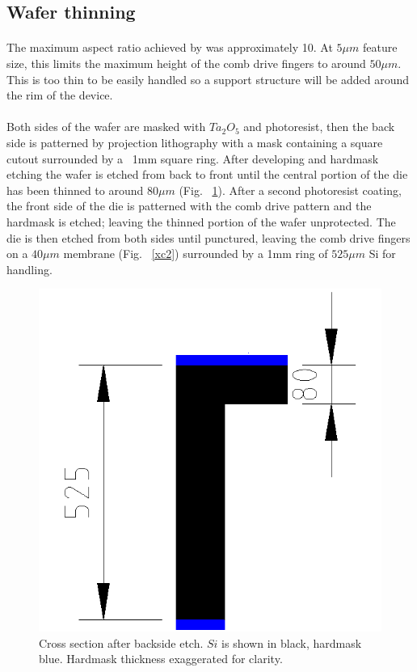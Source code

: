 \documentclass[twocolumn]{article}
\begin{document}
\subsection{Wafer thinning}
\paragraph*{}
The maximum aspect ratio achieved by \cite{SmoothWalls} was approximately 10. At $5 \mu m$ feature
size, this limits the maximum height of the comb drive fingers to around $50 \mu m$. This is too
thin to be easily handled so a support structure will be added around the rim of the device.

\paragraph*{}
Both sides of the wafer are masked with $Ta_2O_5$ and photoresist, then the back side is patterned
by projection lithography with a mask containing a square cutout surrounded by a ~1mm square ring.
After developing and hardmask etching the wafer is etched from back to front until the central
portion of the die has been thinned to around $80 \mu m$ (Fig. ~\ref{xc1}). After a second
photoresist coating, the front side of the die is patterned with the comb drive pattern and the
hardmask is etched; leaving the thinned portion of the wafer unprotected. The die is then etched
from both sides until punctured, leaving the comb drive fingers on a $40 \mu m$ membrane
(Fig. ~\ref{xc2}) surrounded by a 1mm ring of $525 \mu m$ Si for handling.

\begin{figure}[h!]
\begin{center}
\includegraphics[scale=0.25]{CrossSection1.png}
\end{center}
\caption{Cross section after backside etch. $Si$ is shown in black, hardmask blue. Hardmask
thickness exaggerated for clarity.}
\label{xc1}
\end{figure}
\end{document}
